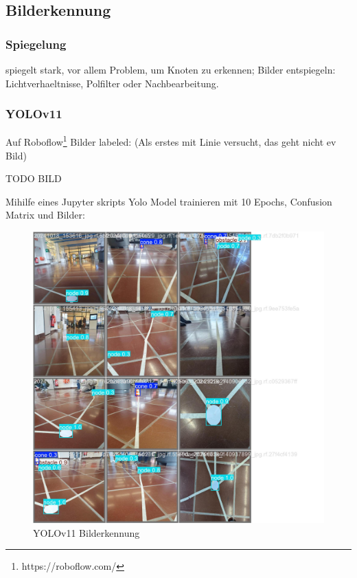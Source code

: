 \subsection{Bilderkennung}

\subsubsection{Spiegelung}

spiegelt stark, vor allem Problem, um Knoten zu erkennen; Bilder entspiegeln: Lichtverhaeltnisse, Polfilter oder Nachbearbeitung.\cite{avoid-reflection}

\subsubsection{YOLOv11}

Auf Roboflow\footnote{https://roboflow.com/} Bilder labeled: (Als erstes mit Linie versucht, das geht nicht ev Bild) 

TODO BILD

Mihilfe eines Jupyter skripts Yolo Model trainieren mit 10 Epochs, Confusion Matrix und Bilder:

\begin{figure}[H]
\centering
\includegraphics[width=\textwidth -30mm]{assets/informatik-prototyp/yolo/recognized-images.jpeg}
\caption{YOLOv11 Bilderkennung}
\label{fig:img-recognition-yolo}
\end{figure}

